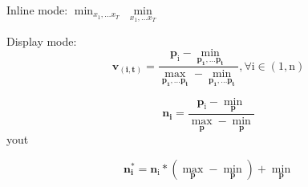 \documentclass{article}
\begin{document}
Inline mode:
$\displaystyle \min_{x_1,\dots x_T}$
$\min\limits_{x_1,\dots x_T}$

\bigskip
Display mode:
\begin{equation}
\mathbf{v_{(i, t)}}  = 
	\mathrm{ \frac{\mathbf{p}_i - \min\limits_{\mathbf{p_1},\dots\mathbf{p_t}}} 
						  {\max\limits_{\mathbf{p_1},\dots\mathbf{p_t}} - \min\limits_{\mathbf{p_1},\dots\mathbf{p_t}}} 
			      , \forall  i \in (1, n)}
\end{equation}


\begin{equation}\label{eq_ltd_normalization}
	\mathbf{n_i}= 
		\frac{\mathrm{\mathbf{p}_i - \min\limits_{\mathbf{p}}}}
		{\mathrm{\max\limits_{\mathbf{p}} -\min\limits_{\mathbf{p}}}}
\end{equation}yout\cite{LeCun3}


	\begin{equation}
\mathbf{n^{*}_i} = \mathrm{\mathbf{n}_i * \left(\max_{\mathbf{p}} - \min_{\mathbf{p}}\right) + \min_{\mathbf{p}}}
\end{equation}
\end{document}
